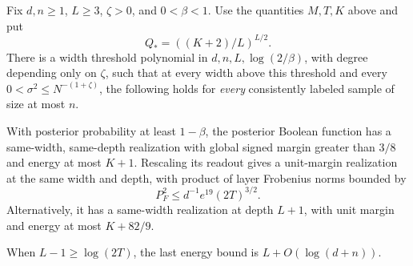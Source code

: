 \begin{theorem}
\label{thm:posterior-energy-ceiling}
Fix $d,n\ge1$, $L\ge3$, $\zeta>0$, and $0<\beta<1$. Use the quantities
$M,T,K$ above and put
\[
 Q_* = ((K+2)/L)^{L/2}.
\]
There is a width threshold polynomial in
$d,n,L,\log(2/\beta)$, with degree depending only on $\zeta$,
such that at every width above this threshold and every
$0<\sigma^2\le N^{-(1+\zeta)}$, the following holds for \emph{every}
consistently labeled sample of size at most $n$.

With posterior probability at least $1-\beta$, the posterior Boolean
function has a same-width, same-depth realization with global signed
margin greater than $3/8$ and energy at most $K+1$.
Rescaling its readout gives a unit-margin realization at the same
width and depth, with product of layer Frobenius norms bounded by
\[
 P_F^2\le d^{-1}e^{19}(2T)^{3/2}.
\]
Alternatively, it has a same-width realization at depth $L+1$, with
unit margin and energy at most $K+82/9$.

When $L-1\ge\log(2T)$, the last energy bound is
$L+O(\log(d+n))$.
\end{theorem}


